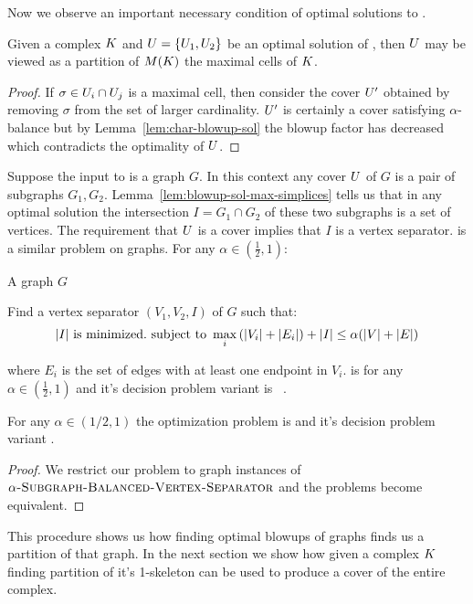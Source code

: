 \noindent Now we observe an important necessary condition of optimal solutions to \ablp{}.
\begin{lemma}
\label{lem:blowup-sol-max-simplices}
Given a complex $K$ and $U = \{U_1, U_2\}$ be an optimal solution of  \ablp{}, then 
$U$ may be viewed as a partition of $M(K)$ the maximal cells of $K$.
\end{lemma}
\begin{proof}
If $\sigma \in U_i \cap U_j$ is a maximal cell, then consider the cover
$U'$ obtained by removing $\sigma$ from the set of larger
cardinality. $U'$ is certainly a cover satisfying $\alpha$-balance but
by Lemma~\ref{lem:char-blowup-sol} the blowup factor has decreased
which contradicts the optimality of $U$.
\end{proof}
\noindent Suppose the input to \ablp{} is a graph $G$. In this context any cover $U$ of $G$ is a pair of subgraphs $G_1,G_2$.
Lemma~\ref{lem:blowup-sol-max-simplices} tells us that in any optimal solution the intersection $I = G_1 \cap G_2$ of these two 
subgraphs is a set of vertices. The requirement that $U$ is a cover implies that $I$ is a vertex separator.  \avertex{} is a similar problem on graphs. 
For any $\alpha \in (\frac{1}{2},1)$:
\begin{description}
\addtolength{\itemsep}{-.8\baselineskip}
\item[\textsc{Problem:}]  \avertex{}
\item[\textsc{Instance:}] A graph $G$
\item[\textsc{Goal:}] Find a vertex separator $(V_1,V_2,I)$ of $G$ such that: 
\[ |I| \textrm{ is minimized.} \textrm{ subject to } \max_i{(|V_i| + |E_i|)} + |I| \leq \alpha(|V|+|E|)  \]
\end{description}
where $E_i$ is the set of edges with at least one endpoint in $V_i$. \avertex{} is \NPH{} for any $\alpha \in (\frac{1}{2},1)$ and it's decision problem variant is \NPC{}~\cite{rhl-yaggpis-14}.
\begin{theorem}
For any $\alpha \in (1/2,1)$ the optimization problem \ablp{}  is \NPH{} and it's decision problem variant \NPC{}.
\end{theorem}
\begin{proof}
We restrict our problem to graph instances of $\textsc{$\alpha$-Subgraph-Balanced-Vertex-Separator}{}$ and the problems become equivalent.
\end{proof}
This procedure shows us how finding optimal blowups of graphs finds us a partition of that graph. In the next section we show how given a complex $K$ 
finding partition of it's 1-skeleton can be used to produce a cover of the entire complex.
